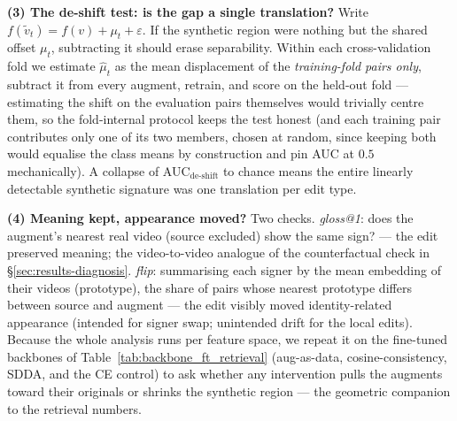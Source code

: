 \textbf{(3) The de-shift test: is the gap a single translation?} Write
$f(\tilde{v}_t)=f(v)+\mu_t+\varepsilon$. If the synthetic region were
nothing but the shared offset $\mu_t$, subtracting it should erase
separability. Within each cross-validation fold we estimate $\hat{\mu}_t$
as the mean displacement of the \emph{training-fold pairs only}, subtract
it from every augment, retrain, and score on the held-out fold ---
estimating the shift on the evaluation pairs themselves would trivially
centre them, so the fold-internal protocol keeps the test honest (and
each training pair contributes only one of its two members, chosen at
random, since keeping both would equalise the class means by construction
and pin AUC at $0.5$ mechanically). A collapse of
AUC$_{\text{de-shift}}$ to chance means the entire linearly detectable
synthetic signature was one translation per edit type.

\textbf{(4) Meaning kept, appearance moved?}
Two checks. \emph{gloss@1}: does the augment's nearest real video
(source excluded) show the same sign? --- the edit preserved meaning; the
video-to-video analogue of the counterfactual check in
\S\ref{sec:results-diagnosis}. \emph{flip}: summarising each signer by the
mean embedding of their videos (prototype), the share of pairs whose
nearest prototype differs between source and augment --- the edit visibly
moved identity-related appearance (intended for signer swap; unintended
drift for the local edits).
Because the whole analysis runs per feature space, we repeat it on the
fine-tuned backbones of Table~\ref{tab:backbone_ft_retrieval}
(aug-as-data, cosine-consistency, SDDA, and the CE control) to ask whether
any intervention pulls the augments toward their originals or shrinks the
synthetic region --- the geometric companion to the retrieval numbers.

